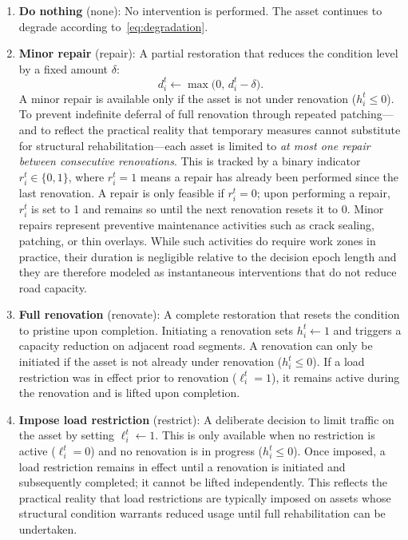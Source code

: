 \documentclass[3p, twocolumn]{elsarticle}
\begin{document}
\begin{enumerate}
    \item \textbf{Do nothing} (\textsf{none}): No intervention is performed. The asset continues to degrade according to~\eqref{eq:degradation}.

    \item \textbf{Minor repair} (\textsf{repair}): A partial restoration that reduces the condition level by a fixed amount $\delta$:
    \begin{equation}
        d_i^t \leftarrow \max\big(0, \, d_i^t - \delta\big).
        \label{eq:repair}
    \end{equation}
    A minor repair is available only if the asset is not under renovation ($h_i^t \leq 0$). To prevent indefinite deferral of full renovation through repeated patching—and to reflect the practical reality that temporary measures cannot substitute for structural rehabilitation—each asset is limited to \emph{at most one repair between consecutive renovations}. This is tracked by a binary indicator $r_i^t \in \{0, 1\}$, where $r_i^t = 1$ means a repair has already been performed since the last renovation. A repair is only feasible if $r_i^t = 0$; upon performing a repair, $r_i^t$ is set to 1 and remains so until the next renovation resets it to 0. Minor repairs represent preventive maintenance activities such as crack sealing, patching, or thin overlays. While such activities do require work zones in practice, their duration is negligible relative to the decision epoch length and they are therefore modeled as instantaneous interventions that do not reduce road capacity.

    \item \textbf{Full renovation} (\textsf{renovate}): A complete restoration that resets the condition to pristine upon completion. Initiating a renovation sets $h_i^t \leftarrow 1$ and triggers a capacity reduction on adjacent road segments. A renovation can only be initiated if the asset is not already under renovation ($h_i^t \leq 0$). If a load restriction was in effect prior to renovation ($\ell_i^t = 1$), it remains active during the renovation and is lifted upon completion.

    \item \textbf{Impose load restriction} (\textsf{restrict}): A deliberate decision to limit traffic on the asset by setting $\ell_i^t \leftarrow 1$. This is only available when no restriction is active ($\ell_i^t = 0$) and no renovation is in progress ($h_i^t \leq 0$). Once imposed, a load restriction remains in effect until a renovation is initiated and subsequently completed; it cannot be lifted independently. This reflects the practical reality that load restrictions are typically imposed on assets whose structural condition warrants reduced usage until full rehabilitation can be undertaken.
\end{enumerate}
\end{document}
